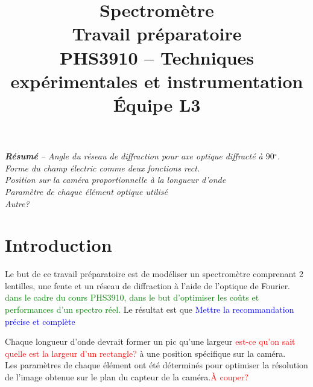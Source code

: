 \documentclass[conference]{IEEEtran}
\begin{document}
\title{Spectromètre\\
\large Travail préparatoire \\
PHS3910 -- Techniques expérimentales et instrumentation\\ 
Équipe L3}

\author{
\and
{}
\and
{}
\and
{}
}

\maketitle

\textit{\textbf{Résumé} -- Angle du réseau de diffraction pour axe optique diffracté à $90{^\circ}$.\\
Forme du champ électric comme deux fonctions rect.\\
Position sur la caméra proportionnelle à la longueur d'onde\\
Paramètre de chaque élément optique utilisé\\
Autre?}



\section{Introduction}
Le but de ce travail préparatoire est de modéliser un spectromètre 
comprenant 2 lentilles, une fente et un réseau de diffraction à 
l'aide de l'optique de Fourier. \textcolor{green}{dans le cadre du cours
PHS3910, dans le but d'optimiser les coûts et performances d'un spectro réel.}
Le résultat est que \textcolor{blue}{Mettre la recommandation précise et complète}

Chaque longueur d'onde devrait former un pic qu'une largeur \textcolor{red}{est-ce qu'on sait quelle est la largeur d'un rectangle?}
à une position spécifique sur la caméra. \\

Les paramètres de chaque élément ont été déterminés pour optimiser 
la résolution de l'image obtenue sur le plan du capteur de la caméra.\textcolor{red}{À couper?}
\end{document}
